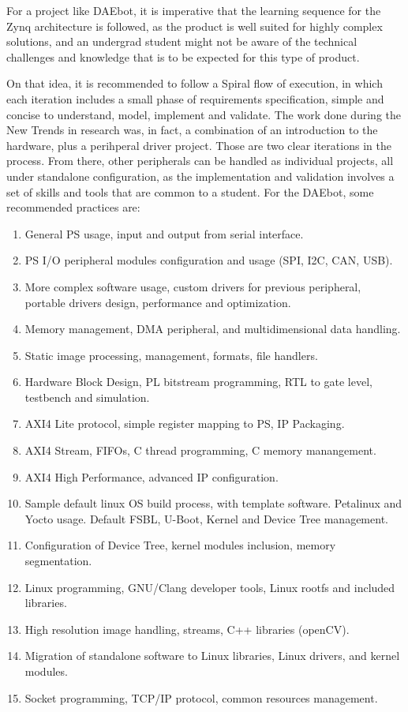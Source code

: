 For a project like DAEbot, it is imperative that the learning sequence for the Zynq architecture is
followed, as the product is well suited for highly complex solutions, and an undergrad student might
not be aware of the technical challenges and knowledge that is to be expected for this type of
product.

On that idea, it is recommended to follow a Spiral flow of execution, in which each iteration
includes a small phase of requirements specification, simple and concise to understand, model,
implement and validate. The work done during the New Trends in research was, in fact, a combination
of an introduction to the hardware, plus a perihperal driver project. Those are two clear iterations
in the process. From there, other peripherals can be handled as individual projects, all under
standalone configuration, as the implementation and validation involves a set of skills and tools
that are common to a student. For the DAEbot, some recommended practices are:

\begin{enumerate}
    \item General PS usage, input and output from serial interface.
    \item PS I/O peripheral modules configuration and usage (SPI, I2C, CAN, USB).
    \item More complex software usage, custom drivers for previous peripheral, portable drivers
    design, performance and optimization.
    \item Memory management, DMA peripheral, and multidimensional data handling.
    \item Static image processing, management, formats, file handlers.
    \item Hardware Block Design, PL bitstream programming, RTL to gate level, testbench and
    simulation.
    \item AXI4 Lite protocol, simple register mapping to PS, IP Packaging.
    \item AXI4 Stream, FIFOs, C thread programming, C memory manangement.
    \item AXI4 High Performance, advanced IP configuration.
    \item Sample default linux OS build process, with template software. Petalinux and Yocto usage.
    Default FSBL, U-Boot, Kernel and Device Tree management.
    \item Configuration of Device Tree, kernel modules inclusion, memory segmentation.
    \item Linux programming, GNU/Clang developer tools, Linux rootfs and included libraries.
    \item High resolution image handling, streams, C++ libraries (openCV).
    \item Migration of standalone software to Linux libraries, Linux drivers, and kernel modules.
    \item Socket programming, TCP/IP protocol, common resources management.
\end{enumerate}

